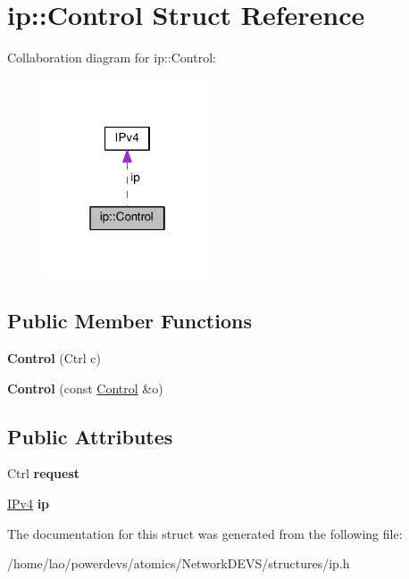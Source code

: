 \hypertarget{structip_1_1Control}{}\section{ip\+:\+:Control Struct Reference}
\label{structip_1_1Control}


Collaboration diagram for ip\+:\+:Control\+:
\nopagebreak
\begin{figure}[H]
\begin{center}
\leavevmode
\includegraphics[width=142pt]{structip_1_1Control__coll__graph}
\end{center}
\end{figure}
\subsection*{Public Member Functions}
\begin{DoxyCompactItemize}
\item 
{\bfseries Control} (Ctrl c)\hypertarget{structip_1_1Control_a32ecd23afdfd205d5b7c7fb780f918ae}{}\label{structip_1_1Control_a32ecd23afdfd205d5b7c7fb780f918ae}

\item 
{\bfseries Control} (const \hyperlink{structip_1_1Control}{Control} \&o)\hypertarget{structip_1_1Control_a082e14e4b06f64d456fb417656ec5f73}{}\label{structip_1_1Control_a082e14e4b06f64d456fb417656ec5f73}

\end{DoxyCompactItemize}
\subsection*{Public Attributes}
\begin{DoxyCompactItemize}
\item 
Ctrl {\bfseries request}\hypertarget{structip_1_1Control_a4d825322ee770bf17c4921947bb98bc6}{}\label{structip_1_1Control_a4d825322ee770bf17c4921947bb98bc6}

\item 
\hyperlink{structIPv4}{I\+Pv4} {\bfseries ip}\hypertarget{structip_1_1Control_aa8de1b05503ff62f1af2032c8d1861e5}{}\label{structip_1_1Control_aa8de1b05503ff62f1af2032c8d1861e5}

\end{DoxyCompactItemize}


The documentation for this struct was generated from the following file\+:\begin{DoxyCompactItemize}
\item 
/home/lao/powerdevs/atomics/\+Network\+D\+E\+V\+S/structures/ip.\+h\end{DoxyCompactItemize}
